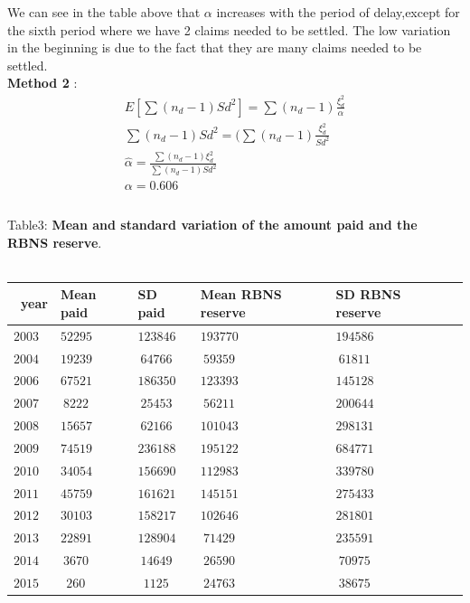 \documentclass[a4paper]{article}
\begin{document}
We can see in the table above that $\alpha$ increases with the period of delay,except for the sixth period where we have 2 claims needed to be settled. The low variation in the beginning is due to the fact that they are many claims needed to be settled.  \\ 



\textbf{Method 2 }:     \begin{align*}E[\sum(n_d - 1) Sd^2] = \sum(n_d - 1)\frac{\xi_d^2}{\alpha}  \\
                \sum(n_d - 1)Sd^2 = (\sum(n_d - 1)\frac{\xi_d^2}{Sd^2}  \\
                 \hat{\alpha} = \frac{\sum(n_d - 1)\xi_d^2}{\sum(n_d - 1)Sd^2}   \\
                  \alpha = 0.606 \\
                  \end{align*} \\
          





Table3: \textbf{Mean and standard variation of the amount paid and the RBNS reserve}. \\~\\

\begin{tabular}{ p{2.5cm} p{2.5cm}  p{2.5cm}  p{2.5cm} p{2.5cm}  p{2.5cm}}
\hline \noalign{\smallskip}
  ~year &Mean paid & SD paid &    Mean RBNS reserve  &  SD RBNS reserve\\[.1cm]
\hline \noalign{\smallskip}   
$2003$&$52295$&  $123846 $&  $193770 $&$ 194586 $\\[.2cm]
$2004$&$19239 $&  $~64766 $&  $~59359 $&  $ ~61811$\\[.2cm]
$2006$&$67521$&  $186350 $& $123393 $&  $145128 $\\[.2cm]
$2007$&$~8222 $& $~25453 $& $~56211 $ & $ 200644 $\\[.2cm]
$2008$&$15657 $& $~62166 $& $101043 $ &$ 298131 $\\[.2cm]
$2009$&$74519 $& $236188 $&$195122 $ &$684771 $\\[.2cm]
$2010$&$34054 $&$156690 $&$ 112983 $&$ 339780 $\\[.2cm]
$2011$&$ 45759 $&$ 161621 $ &$145151 $ &$275433 $\\[.2cm]
$2012$&$30103 $&$ 158217 $ &$102646 $&$281801 $\\[.2cm]
$2013$&$ 22891$&$ 128904  $ &$~71429 $ &$ 235591 $\\[.2cm]
$2014$&$ ~3670 $&$ ~14649  $ &$~26590$ &$~70975 $\\[.2cm]
$2015$&$ ~~260  $&$ ~~1125  $  &$~24763$ &$~38675 $\\[.2cm]
\hline
\end{tabular} \\~\\
\end{document}
